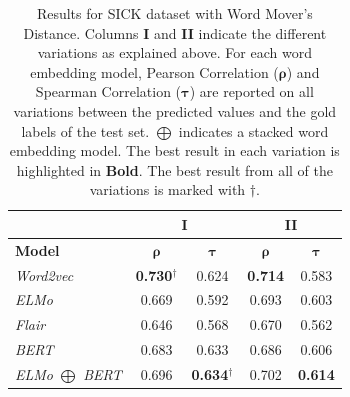 \begin{enumerate}
\begin{table}[htb]
{\begin{tabular}{|l|cc|cc|}
			\hline & 
			\multicolumn{2}{c|}{\textbf{I}}    & \multicolumn{2}{c|}{\textbf{II}}   \\ 
			\hline
			\multicolumn{1}{|l|}{\textbf{Model}} 
			& $\bm{\rho}$   & $\bm{\tau}$     
			& $\bm{\rho}$   & $\bm{\tau}$  
			\\ \hline
			\textit{Word2vec}                  
			& \textbf{0.730}$^{\dagger}$  & 0.624        
			& \textbf{0.714}        & 0.583   \\
			\textit{ELMo}                     
			& 0.669                 & 0.592         
			& 0.693                 & 0.603    \\
			\textit{Flair}                     
			& 0.646                 & 0.568         
			& 0.670                 & 0.562    \\
			\textit{BERT}                     
			& 0.683                 & 0.633         
			& 0.686                 & 0.606  \\
			\textit{ELMo $\bigoplus$ BERT}                     
			& 0.696                 & \textbf{0.634}$^{\dagger}$          
			& 0.702                 & \textbf{0.614}  \\
			\hline
		\end{tabular}
	}
	\caption[Results for SICK with Word Mover's Distance]{Results for SICK dataset with Word Mover's Distance. Columns \textbf{I} and \textbf{II} indicate the different variations as explained above. For each word embedding model, Pearson Correlation ($\bm{\rho}$) and Spearman Correlation ($\bm{\tau}$) are reported on all variations between the predicted values and the gold labels of the test set. $\bigoplus$ indicates a stacked word embedding model. The best result in each variation is highlighted in \textbf{Bold}. The best result from all of the variations is marked with ${\dagger}$. }  
	\label{tab:sick_word_movers}
\end{table}

\begin{table}[htb]
	\centering
\end{table}
\end{enumerate}
